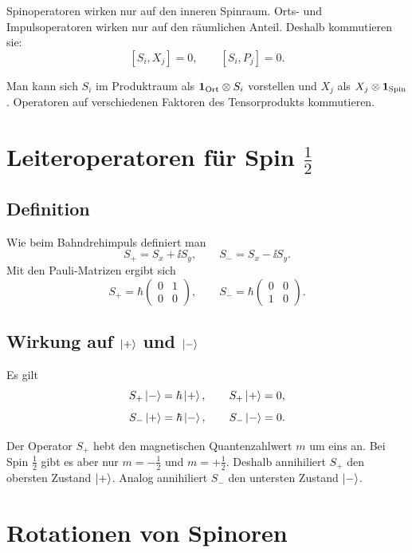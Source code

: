 Spinoperatoren wirken nur auf den inneren Spinraum. Orts- und Impulsoperatoren wirken nur auf den räumlichen Anteil. Deshalb kommutieren sie:
\[
    [S_i,X_j]=0,
    \qquad
    [S_i,P_j]=0.
\]

\begin{notebox}
Man kann sich \(S_i\) im Produktraum als \(\mathbf{1}_{\text{Ort}}\otimes S_i\) vorstellen und \(X_j\) als \(X_j\otimes\mathbf{1}_{\text{Spin}}\). Operatoren auf verschiedenen Faktoren des Tensorprodukts kommutieren.
\end{notebox}

\section{Leiteroperatoren für Spin \texorpdfstring{\(\frac12\)}{1/2}}

\subsection{Definition}

Wie beim Bahndrehimpuls definiert man
\[
    S_+ = S_x+\ii S_y,
    \qquad
    S_- = S_x-\ii S_y.
\]
Mit den Pauli-Matrizen ergibt sich
\[
    S_+ = \hbar
    \begin{pmatrix}
        0&1\\0&0
    \end{pmatrix},
    \qquad
    S_- = \hbar
    \begin{pmatrix}
        0&0\\1&0
    \end{pmatrix}.
\]

\subsection{Wirkung auf \(\left|+\right\rangle\) und \(\left|-\right\rangle\)}

Es gilt
\[
    S_+\left|-\right\rangle=\hbar\left|+\right\rangle,
    \qquad
    S_+\left|+\right\rangle=0,
\]
\[
    S_-\left|+\right\rangle=\hbar\left|-\right\rangle,
    \qquad
    S_-\left|-\right\rangle=0.
\]

\begin{conceptbox}
Der Operator \(S_+\) hebt den magnetischen Quantenzahlwert \(m\) um eins an. Bei Spin \(\frac12\) gibt es aber nur \(m=-\frac12\) und \(m=+\frac12\). Deshalb annihiliert \(S_+\) den obersten Zustand \(\left|+\right\rangle\). Analog annihiliert \(S_-\) den untersten Zustand \(\left|-\right\rangle\).
\end{conceptbox}

\section{Rotationen von Spinoren}

